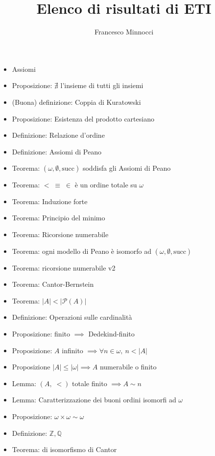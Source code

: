 \documentclass[a4paper]{article}
\newcommand{\Q}{\mathbb{Q}}
\newcommand{\Z}{\mathbb{Z}}
\begin{document}
\title{Elenco di risultati di ETI}
\author{Francesco Minnocci}
\date{\vspace{-4ex}}
\maketitle
\begin{multicols}{2}
\begin{itemize}
	\item Assiomi
	\item Proposizione: \(\nexists\) l'insieme di tutti gli insiemi
	\item (Buona) definizione: Coppia di Kuratowski
	\item Proposizione: Esistenza del prodotto cartesiano
	\item Definizione: Relazione d'ordine
	\item Definizione: Assiomi di Peano
	\item Teorema: \((\omega,\emptyset,\text{succ})\) soddisfa gli Assiomi di Peano
	\item Teorema: \(<\;\equiv\;\in\) è un ordine totale su \(\omega\)
	\item Teorema: Induzione forte
	\item Teorema: Principio del minimo
	\item Teorema: Ricorsione numerabile
	\item Teorema: ogni modello di Peano è isomorfo ad \((\omega,\emptyset,\text{succ})\)
	\item Teorema: ricorsione numerabile v2
	\item Teorema: Cantor-Bernstein
	\item Teorema: \(|A|<|\mathcal{P}\left( A \right) |\)
	\item Definizione: Operazioni sulle cardinalità
	\item Proposizione: finito \(\implies\) Dedekind-finito
	\item Proposizione: \(A\) infinito \(\implies\forall n\in\omega,~n<|A|\)
	\item Proposizione \(|A|\leq|\omega|\implies A\) numerabile o finito
	\item Lemma: \(\left( A,\;< \right) \) totale finito \(\implies A\sim n\)
	\item Lemma: Caratterizzazione dei buoni ordini isomorfi ad \(\omega\)
	\item Proposizione: \(\omega\times\omega\sim\omega\)
	\item Definizione: \(\Z, \Q\)
	\item Teorema: di isomorfismo di Cantor

\end{itemize}
\end{multicols}
\end{document}
